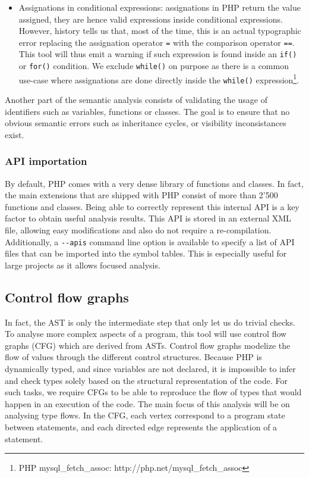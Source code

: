 \documentclass[a4paper]{article}
\begin{document}
\begin{itemize}
    variable, or an expression\footnote{PHP Variable variables:
    http://php.net/variables.variable}: (\verb=$$var= or
    \verb=${'prefix'.$name.foo()}=).
  \item Assignations in conditional expressions: assignations in PHP return the
    value assigned, they are hence valid expressions inside conditional
    expressions. However, history tells us that, most of the time, this is an
    actual typographic error replacing the assignation operator \verb&=& with
    the comparison operator \verb&==&. This tool will thus emit a warning if
    such expression is found inside an \verb&if()& or \verb&for()& condition.
    We exclude \verb&while()& on purpose as there is a common use-case where
    assignations are done directly inside the \verb&while()&
    expression\footnote{PHP mysql\_fetch\_assoc:
    http://php.net/mysql\_fetch\_assoc}.
\end{itemize}

Another part of the semantic analysis consists of validating the usage of
identifiers such as variables, functions or classes. The goal is to ensure that
no obvious semantic errors such as inheritance cycles, or visibility
inconsistances exist.

\subsubsection{API importation}
By default, PHP comes with a very dense library of functions and classes. In
fact, the main extensions that are shipped with PHP consist of more than 2'500
functions and classes. Being able to correctly represent this internal API is
a key factor to obtain useful analysis results. This API is stored in an external
XML file, allowing easy modifications and also do not require a re-compilation.
Additionally, a \verb=--apis= command line option is available to specify a
list of API files that can be imported into the symbol tables. This is especially
useful for large projects as it allows focused analysis.



\subsection{Control flow graphs}
In fact, the AST is only the intermediate step that only let us do trivial
checks. To analyse more complex aspects of a program, this tool will use
control flow graphs (CFG) which are derived from ASTs.  Control flow graphs
modelize the flow of values through the different control structures. Because
PHP is dynamically typed, and since variables are not declared, it is
impossible to infer and check types solely based on the structural
representation of the code. For such tasks, we require CFGs to be able to
reproduce the flow of types that would happen in an execution of the code. The
main focus of this analysis will be on analysing type flows. In the CFG, each
vertex correspond to a program state between statements, and each directed edge
represents the application of a statement.
\end{document}
